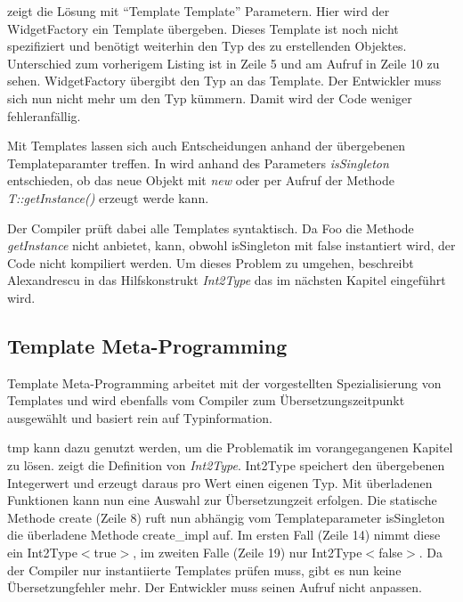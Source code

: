 

 zeigt die Lösung mit ``Template Template'' Parametern. Hier wird der WidgetFactory ein Template übergeben. Dieses Template ist noch nicht spezifiziert und benötigt weiterhin den Typ des zu erstellenden Objektes. Unterschied zum vorherigem Listing ist in Zeile 5 und am Aufruf in Zeile 10 zu sehen. WidgetFactory übergibt den Typ an das Template. Der Entwickler muss sich nun nicht mehr um den Typ kümmern. Damit wird der Code weniger fehleranfällig.



Mit Templates lassen sich auch Entscheidungen anhand der übergebenen Templateparamter treffen. In  wird anhand des Parameters \emph{isSingleton} entschieden, ob das neue Objekt mit \emph{new} oder per Aufruf der Methode \emph{T::getInstance()} erzeugt werde kann.



 Der Compiler prüft dabei alle Templates syntaktisch. Da Foo die Methode \emph{getInstance} nicht anbietet, kann, obwohl isSingleton mit false instantiert wird, der Code nicht kompiliert werden. Um dieses Problem zu umgehen, beschreibt Alexandrescu in \cite{Alexandrescu2001Modern} das Hilfskonstrukt \emph{Int2Type} das im nächsten Kapitel eingeführt wird.

\subsection{Template Meta-Programming}
Template Meta-Programming arbeitet mit der vorgestellten Spezialisierung von Templates und wird ebenfalls vom Compiler zum Übersetzungszeitpunkt ausgewählt und basiert rein auf Typinformation.

\ac{tmp} kann dazu genutzt werden, um die Problematik im vorangegangenen Kapitel zu lösen.  zeigt die Definition von \emph{Int2Type}. Int2Type speichert den übergebenen Integerwert und erzeugt daraus pro Wert einen eigenen Typ. Mit überladenen Funktionen kann nun eine Auswahl zur Übersetzungzeit erfolgen. Die statische Methode create (Zeile 8) ruft nun abhängig vom Templateparameter isSingleton die überladene Methode create\_impl auf. Im ersten Fall (Zeile 14) nimmt diese ein Int2Type$<$true$>$, im zweiten Falle (Zeile 19) nur Int2Type$<$false$>$. Da der Compiler nur instantiierte Templates prüfen muss, gibt es nun keine Übersetzungfehler mehr. Der Entwickler muss seinen Aufruf nicht anpassen.

